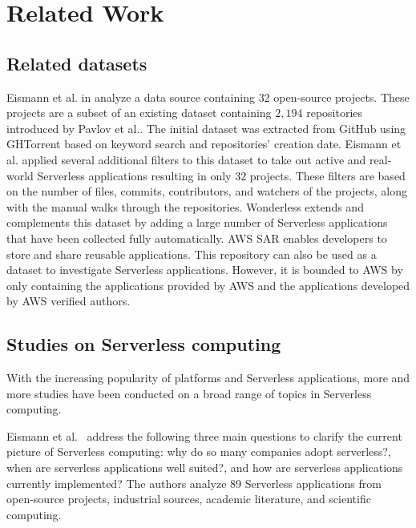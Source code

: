 
\section{Related Work}
\label{relatedwork}

\subsection{Related datasets}
Eismann et al. in \cite{eismann2020serverless} analyze a data source 
containing $32$ open-source projects. These projects are a subset of 
an existing dataset containing $2,194$ repositories introduced by 
Pavlov et al.\cite{pavlov2019serverless}. The initial dataset was extracted 
from GitHub using GHTorrent based on keyword search and repositories' 
creation date. Eismann et al. applied several additional filters to this dataset 
to take out active and real-world Serverless applications resulting in only $32$
projects. These filters are based on the number of files, commits, 
contributors, and watchers of the projects, along with the manual walks 
through the repositories. Wonderless extends and complements 
this dataset by adding a large number of Serverless applications that 
have been collected fully automatically.
AWS SAR enables developers to store and share reusable applications. 
This repository can also be used as a dataset to investigate Serverless 
applications. However, it is bounded to AWS by only containing the 
applications provided by AWS and the applications developed by 
AWS verified authors.


\subsection{Studies on Serverless computing}

With the increasing popularity of \faas platforms and Serverless applications, 
more and more studies have been conducted on a broad range of topics in 
Serverless computing. 

Eismann et al.~\cite{eismann2020serverless} address the following 
three main questions to clarify the current picture of Serverless computing: 
why do so many companies adopt serverless?, when are serverless applications 
well suited?, and how are serverless applications currently implemented? 
The authors analyze 89 Serverless applications from open-source projects, 
industrial sources, academic literature, and scientific computing. 


